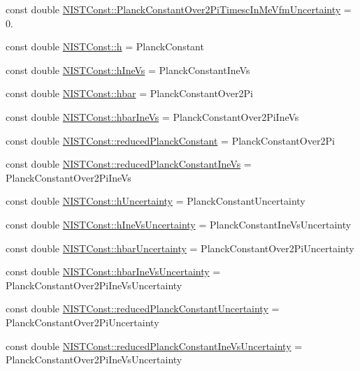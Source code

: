 \begin{DoxyCompactItemize}
\item 
const double \hyperlink{group___n_i_s_t_const-_planck_constant_gae5db39f3f8b53c75ed26b3b83b74bb42}{N\+I\+S\+T\+Const\+::\+Planck\+Constant\+Over2\+Pi\+Timesc\+In\+Me\+Vfm\+Uncertainty} = 0.
\item 
const double \hyperlink{group___n_i_s_t_const-_planck_constant_ga772638524d12d0e8a63abb25441f87a9}{N\+I\+S\+T\+Const\+::h} = Planck\+Constant
\item 
const double \hyperlink{group___n_i_s_t_const-_planck_constant_gabdd6f21b3e5325e4df4a021ee6b6a506}{N\+I\+S\+T\+Const\+::h\+Ine\+Vs} = Planck\+Constant\+Ine\+Vs
\item 
const double \hyperlink{group___n_i_s_t_const-_planck_constant_gaec21867afdeb1950b150e667513cd842}{N\+I\+S\+T\+Const\+::hbar} = Planck\+Constant\+Over2\+Pi
\item 
const double \hyperlink{group___n_i_s_t_const-_planck_constant_gacbb39d7d0090ed14cb725a1d6eaa3fd3}{N\+I\+S\+T\+Const\+::hbar\+Ine\+Vs} = Planck\+Constant\+Over2\+Pi\+Ine\+Vs
\item 
const double \hyperlink{group___n_i_s_t_const-_planck_constant_ga91e80f15330603015f6f8f8e8f49c926}{N\+I\+S\+T\+Const\+::reduced\+Planck\+Constant} = Planck\+Constant\+Over2\+Pi
\item 
const double \hyperlink{group___n_i_s_t_const-_planck_constant_gab9efdc081c1c1a03ca7a233d1589b1d8}{N\+I\+S\+T\+Const\+::reduced\+Planck\+Constant\+Ine\+Vs} = Planck\+Constant\+Over2\+Pi\+Ine\+Vs
\item 
const double \hyperlink{group___n_i_s_t_const-_planck_constant_gaa3328612ae3a58889a270b440849b73a}{N\+I\+S\+T\+Const\+::h\+Uncertainty} = Planck\+Constant\+Uncertainty
\item 
const double \hyperlink{group___n_i_s_t_const-_planck_constant_gadbf2b61fe6b0389e003a788047ad0c43}{N\+I\+S\+T\+Const\+::h\+Ine\+Vs\+Uncertainty} = Planck\+Constant\+Ine\+Vs\+Uncertainty
\item 
const double \hyperlink{group___n_i_s_t_const-_planck_constant_ga2f2785d3e09a94615ed207e936f73f74}{N\+I\+S\+T\+Const\+::hbar\+Uncertainty} = Planck\+Constant\+Over2\+Pi\+Uncertainty
\item 
const double \hyperlink{group___n_i_s_t_const-_planck_constant_ga58501029ba9f6b757d6d9992dfb56b4f}{N\+I\+S\+T\+Const\+::hbar\+Ine\+Vs\+Uncertainty} = Planck\+Constant\+Over2\+Pi\+Ine\+Vs\+Uncertainty
\item 
const double \hyperlink{group___n_i_s_t_const-_planck_constant_ga723312692d243868ce31c9ac7172cab9}{N\+I\+S\+T\+Const\+::reduced\+Planck\+Constant\+Uncertainty} = Planck\+Constant\+Over2\+Pi\+Uncertainty
\item 
const double \hyperlink{group___n_i_s_t_const-_planck_constant_ga90ccf5a0925f9ffdf8c289a7f2155482}{N\+I\+S\+T\+Const\+::reduced\+Planck\+Constant\+Ine\+Vs\+Uncertainty} = Planck\+Constant\+Over2\+Pi\+Ine\+Vs\+Uncertainty
\end{DoxyCompactItemize}


